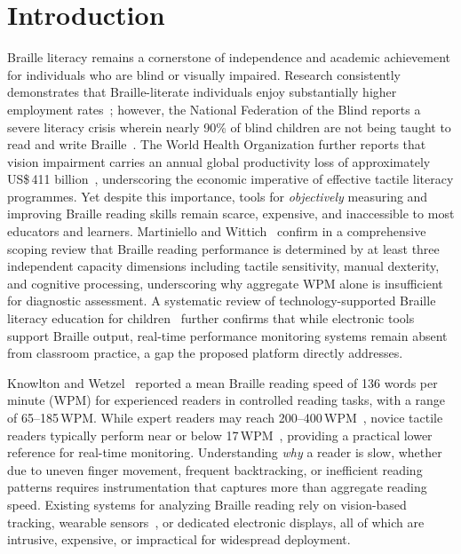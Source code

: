 \documentclass[conference]{IEEEtran}
\begin{document}
    \section{Introduction}
    \label{sec:intro}

    Braille literacy remains a cornerstone of independence and academic
    achievement for individuals who are blind or visually impaired.
    Research consistently demonstrates that Braille-literate individuals
    enjoy substantially higher employment rates~\cite{b10}; however, the National Federation of the Blind reports a severe literacy crisis wherein nearly 90\% of blind children are not being taught to read and write Braille~\cite{nfb2009}. The World Health
    Organization further reports that vision impairment carries an annual
    global productivity loss of approximately
    US\$\,411 billion~\cite{b11}, underscoring the economic imperative of
    effective tactile literacy programmes. Yet despite this importance,
    tools for \emph{objectively} measuring and improving Braille reading
    skills remain scarce, expensive, and inaccessible to most educators
    and learners. Martiniello and Wittich~\cite{martiniello2022} confirm in a
    comprehensive scoping review that Braille reading performance is determined
    by at least three independent capacity dimensions including tactile sensitivity,
    manual dexterity, and cognitive processing, underscoring why aggregate WPM
    alone is insufficient for diagnostic assessment. A systematic review of
    technology-supported Braille literacy education for
    children~\cite{techbraillesysrev2022} further confirms that while electronic
    tools support Braille output, real-time performance monitoring systems remain
    absent from classroom practice, a gap the proposed platform directly
    addresses.

    Knowlton and Wetzel~\cite{b12} reported a mean Braille reading speed
    of 136 words per minute (WPM) for experienced readers in controlled
    reading tasks, with a range of 65--185\,WPM. While expert readers may reach 200--400\,WPM~\cite{legge1999}, novice tactile readers typically perform near or below 17\,WPM~\cite{b12}, providing a practical lower reference for real-time monitoring. Understanding \emph{why} a reader is slow, whether due
    to uneven finger movement, frequent backtracking, or inefficient
    reading patterns requires instrumentation that captures more than
    aggregate reading speed. Existing systems for analyzing Braille
    reading  rely on vision-based tracking, wearable sensors~\cite{divyansh-vlsid, divyansh-iccae, chinmay-sensors}, or
    dedicated electronic displays, all of which are intrusive, expensive,
    or impractical for widespread deployment.
\end{document}
